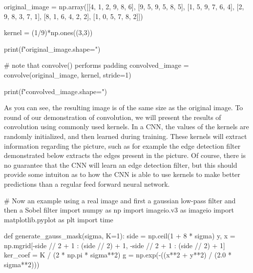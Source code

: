 \documentclass[%
oneside,                 %
final,                   %
10pt]{article}
\begin{document}
\bpycod

original_image = np.array([[4, 1, 2, 9, 8, 6],
                 [9, 5, 9, 5, 8, 5],
                 [1, 5, 9, 7, 6, 4],
                 [2, 9, 8, 3, 7, 1],
                 [8, 1, 6, 4, 2, 2],
                 [1, 0, 5, 7, 8, 2]])

kernel = (1/9)*np.ones((3,3))

print(f"{original_image.shape=}")

# note that convolve() performs padding
convolved_image = convolve(original_image, kernel, stride=1)

print(f"{convolved_image.shape=}")

\epycod


As you can see, the resulting image is of the same size as the
original image. To round of our demonstration of convolution, we will
present the results of convolution using commonly used kernels. In a
CNN, the values of the kernels are randomly initialized, and then
learned during training. These kernels will extract information
regarding the picture, such as for example the edge detection filter
demonstrated below extracts the edges present in the picture. Of
course, there is no guarantee that the CNN will learn an edge
detection filter, but this should provide some intuiton as to how the
CNN is able to use kernels to make better predictions than a regular
feed forward neural network.









































\bpycod
# Now an example using a real image and first a gaussian low-pass filter and then a Sobel filter
import numpy as np
import imageio.v3 as imageio
import matplotlib.pyplot as plt
import time

def generate_gauss_mask(sigma, K=1):
    side = np.ceil(1 + 8 * sigma)
    y, x = np.mgrid[-side // 2 + 1 : (side // 2) + 1, -side // 2 + 1 : (side // 2) + 1]
    ker_coef = K / (2 * np.pi * sigma**2)
    g = np.exp(-((x**2 + y**2) / (2.0 * sigma**2)))
\end{document}
